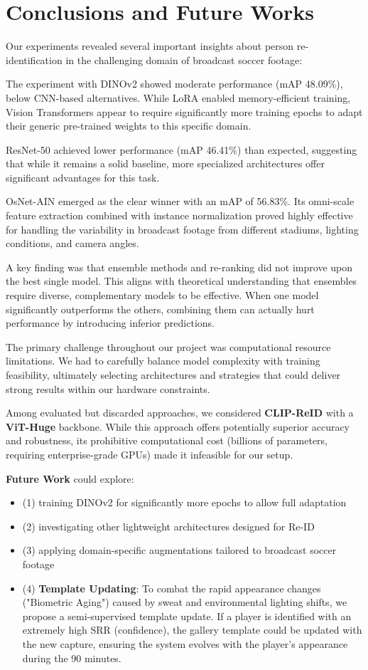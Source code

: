 \documentclass[10pt,twocolumn,letterpaper]{article}
\begin{document}
\section{Conclusions and Future Works}

Our experiments revealed several important insights about person re-identification in the challenging domain of broadcast soccer footage:

The experiment with DINOv2 showed moderate performance (mAP 48.09\%), below CNN-based alternatives. While LoRA enabled memory-efficient training, Vision Transformers appear to require significantly more training epochs to adapt their generic pre-trained weights to this specific domain.

ResNet-50 achieved lower performance (mAP 46.41\%) than expected, suggesting that while it remains a solid baseline, more specialized architectures offer significant advantages for this task.

OsNet-AIN emerged as the clear winner with an mAP of 56.83\%. Its omni-scale feature extraction combined with instance normalization proved highly effective for handling the variability in broadcast footage from different stadiums, lighting conditions, and camera angles.

A key finding was that ensemble methods and re-ranking did not improve upon the best single model. This aligns with theoretical understanding that ensembles require diverse, complementary models to be effective. When one model significantly outperforms the others, combining them can actually hurt performance by introducing inferior predictions.

The primary challenge throughout our project was computational resource limitations. We had to carefully balance model complexity with training feasibility, ultimately selecting architectures and strategies that could deliver strong results within our hardware constraints.

Among evaluated but discarded approaches, we considered \textbf{CLIP-ReID} with a \textbf{ViT-Huge} backbone. While this approach offers potentially superior accuracy and robustness, its prohibitive computational cost (billions of parameters, requiring enterprise-grade GPUs) made it infeasible for our setup.

\textbf{Future Work} could explore: 
\begin{itemize}
    \item (1) training DINOv2 for significantly more epochs to allow full adaptation
    \item (2) investigating other lightweight architectures designed for Re-ID
    \item (3) applying domain-specific augmentations tailored to broadcast soccer footage
    \item (4) \textbf{Template Updating}: To combat the rapid appearance changes ("Biometric Aging") caused by sweat and environmental lighting shifts, we propose a semi-supervised template update. If a player is identified with an extremely high SRR (confidence), the gallery template could be updated with the new capture, ensuring the system evolves with the player's appearance during the 90 minutes.
\end{itemize}
\end{document}
